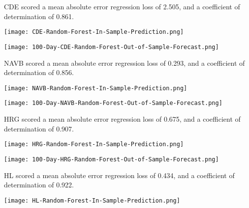 CDE scored a mean absolute error regression loss of 2.505, and a coefficient of determination of 0.861.

\begin{center}
    \texttt{[image: CDE-Random-Forest-In-Sample-Prediction.png]}
    \label{fig:nonfloat}
\end{center}

\begin{center}  
    \texttt{[image: 100-Day-CDE-Random-Forest-Out-of-Sample-Forecast.png]}
    \label{fig:nonfloat}
\end{center}

NAVB scored a mean absolute error regression loss of 0.293, and a coefficient of determination of 0.856.

\begin{center}
    \texttt{[image: NAVB-Random-Forest-In-Sample-Prediction.png]}
    \label{fig:nonfloat}
\end{center}

\begin{center}  
    \texttt{[image: 100-Day-NAVB-Random-Forest-Out-of-Sample-Forecast.png]}
    \label{fig:nonfloat}
\end{center}

HRG scored a mean absolute error regression loss of 0.675, and a coefficient of determination of 0.907.

\begin{center}
    \texttt{[image: HRG-Random-Forest-In-Sample-Prediction.png]}
    \label{fig:nonfloat}
\end{center}

\begin{center}  
    \texttt{[image: 100-Day-HRG-Random-Forest-Out-of-Sample-Forecast.png]}
    \label{fig:nonfloat}
\end{center}

HL scored a mean absolute error regression loss of 0.434, and a coefficient of determination of 0.922.

\begin{center}
    \texttt{[image: HL-Random-Forest-In-Sample-Prediction.png]}
    \label{fig:nonfloat}
\end{center}

